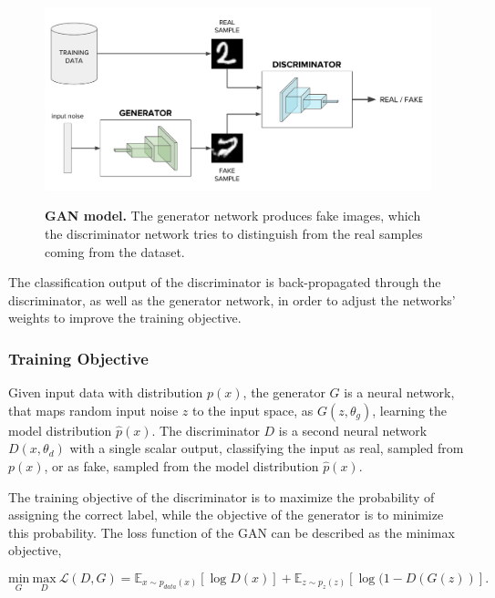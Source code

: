 \documentclass{article}
\begin{document}
\begin{figure}[h]
\centering
{\includegraphics[width=\linewidth]{GAN/gan_model}}
\caption{\label{fig:gan} \textbf{GAN model.} The generator network produces fake images, which the discriminator network tries to distinguish from the real samples coming from the dataset.}
\end{figure}

The classification output of the discriminator is back-propagated  through the discriminator, as well as the generator network, in order to adjust the networks' weights to improve the training objective.

\subsubsection{Training Objective} \label{sec:GAN_training}

Given input data with distribution $p(x)$, the generator $G$ is a neural network, that maps random input noise $z$ to the input space, as $G(z, \theta_{g})$, learning the model distribution $\hat{p}(x)$. The discriminator $D$ is a second neural network $D(x, \theta_{d})$ with a single scalar output, classifying the input as real, sampled from $p(x)$, or as fake, sampled from the model distribution $\hat{p}(x)$. 

The training objective of the discriminator is to maximize the probability of assigning the correct label, while the objective of the generator is to minimize this probability. The loss function of the GAN can be described as the minimax objective,

\begin{equation}
\underset{G}{\mathrm{min}} \ \underset{D}{\mathrm{max}} \ \mathcal{L}(D,G) = \mathbb{E}_{x \sim p_{data}(x)}[\log D(x)] + \mathbb{E}_{z \sim p_{z}(z)}[\log (1 - D(G(z))].
\label{eq:minimax}
\end{equation}
\end{document}
